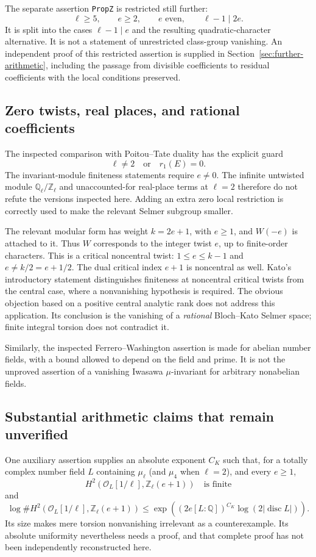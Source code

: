 \documentclass[11pt,a4paper]{article}
\theoremstyle{remark}
\newcommand{\Z}{\mathbb Z}
\newcommand{\Q}{\mathbb Q}
\newcommand{\OO}{\mathcal O}
\newcommand{\src}[1]{\cite{#1}}
\newcommand{\code}[1]{\texttt{#1}}
\begin{document}
The separate assertion \code{PropZ} is restricted still further:
\[
 \ell\ge5,\qquad e\ge2,\qquad e\text{ even},
 \qquad \ell-1\mid2e.
\]
It is split into the cases $\ell-1\mid e$ and the resulting quadratic-character alternative. It is not a statement of unrestricted class-group vanishing. An independent proof of this restricted assertion is supplied in Section~\ref{sec:further-arithmetic}, including the passage from divisible coefficients to residual coefficients with the local conditions preserved.

\subsection{Zero twists, real places, and rational coefficients}
The inspected comparison with Poitou--Tate duality has the explicit guard
\[
 \ell\ne2\quad\text{or}\quad r_1(E)=0.
\]
The invariant-module finiteness statements require $e\ne0$. The infinite untwisted module $\Q_\ell/\Z_\ell$ and unaccounted-for real-place terms at $\ell=2$ therefore do not refute the versions inspected here. Adding an extra zero local restriction is correctly used to make the relevant Selmer subgroup smaller. \src{S-cohomology,S-counts}

The relevant modular form has weight $k=2e+1$, with $e\ge1$, and $W(-e)$ is attached to it. Thus $W$ corresponds to the integer twist $e$, up to finite-order characters. This is a critical noncentral twist: $1\le e\le k-1$ and $e\ne k/2=e+1/2$. The dual critical index $e+1$ is noncentral as well. Kato's introductory statement distinguishes finiteness at noncentral critical twists from the central case, where a nonvanishing hypothesis is required. The obvious objection based on a positive central analytic rank does not address this application. Its conclusion is the vanishing of a \emph{rational} Bloch--Kato Selmer space; finite integral torsion does not contradict it. \src{S-kato,kato}

Similarly, the inspected Ferrero--Washington assertion is made for abelian number fields, with a bound allowed to depend on the field and prime. It is not the unproved assertion of a vanishing Iwasawa $\mu$-invariant for arbitrary nonabelian fields. \src{S-fw}

\subsection{Substantial arithmetic claims that remain unverified}
One auxiliary assertion supplies an absolute exponent $C_K$ such that, for a totally complex number field $L$ containing $\mu_\ell$ (and $\mu_4$ when $\ell=2$), and every $e\ge1$,
\[
 H^2(\OO_L[1/\ell],\Z_\ell(e+1))
 \quad\text{is finite}
\]
and
\[
 \log\#H^2(\OO_L[1/\ell],\Z_\ell(e+1))
 \le
 \exp\left((2e[L:\Q])^{C_K}
                 \log(2|\operatorname{disc}L|)\right).
\]
Its size makes mere torsion nonvanishing irrelevant as a counterexample. Its absolute uniformity nevertheless needs a proof, and that complete proof has not been independently reconstructed here. \src{S-lemmaK}
\end{document}
